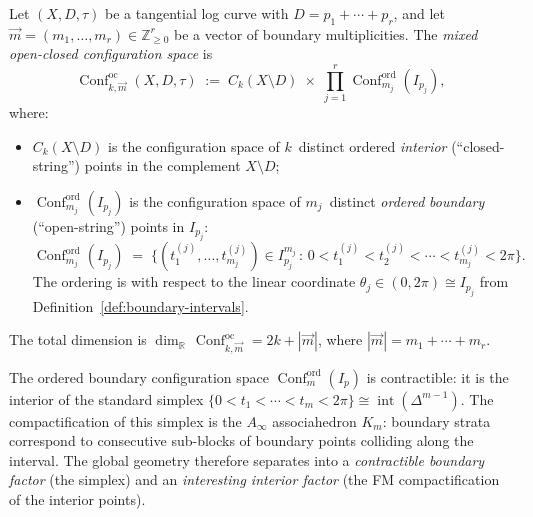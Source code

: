 \begin{definition}
\label{def:mixed-config-space}
Let $(X, D, \tau)$ be a tangential log curve with $D = p_1 +
\cdots + p_r$, and let $\vec{m} = (m_1, \ldots, m_r) \in
\mathbb{Z}_{\geq 0}^r$ be a vector of boundary multiplicities.
The \emph{mixed open-closed configuration space} is
\begin{equation}\label{eq:mixed-config-space}
\operatorname{Conf}^{\mathrm{oc}}_{k, \vec{m}}(X, D, \tau)
\;:=\;
C_k(X \setminus D)
\;\times\;
\prod_{j=1}^{r}
\operatorname{Conf}^{\mathrm{ord}}_{m_j}(I_{p_j}),
\end{equation}
where:
\begin{itemize}
\item $C_k(X \setminus D)$ is the configuration space of
  $k$~distinct ordered \emph{interior} (``closed-string'') points
  in the complement $X \setminus D$;
\item $\operatorname{Conf}^{\mathrm{ord}}_{m_j}(I_{p_j})$ is the
  configuration space of $m_j$~distinct \emph{ordered}
  \emph{boundary} (``open-string'') points in $I_{p_j}$:
  \begin{equation}\label{eq:ordered-boundary-config}
  \operatorname{Conf}^{\mathrm{ord}}_{m_j}(I_{p_j})
  \;=\;
  \bigl\{(t_1^{(j)}, \ldots, t_{m_j}^{(j)}) \in
  I_{p_j}^{m_j}
  \,:\,
  0 < t_1^{(j)} < t_2^{(j)} < \cdots < t_{m_j}^{(j)} < 2\pi
  \bigr\}.
  \end{equation}
  The ordering is with respect to the linear coordinate
  $\theta_j \in (0, 2\pi) \cong I_{p_j}$ from
  Definition~\ref{def:boundary-intervals}.
\end{itemize}
The total dimension is
$\dim_{\mathbb{R}}\,
\operatorname{Conf}^{\mathrm{oc}}_{k,\vec{m}}
= 2k + |\vec{m}|$,
where $|\vec{m}| = m_1 + \cdots + m_r$.
\end{definition}

\begin{remark}
\label{rem:boundary-ordering-associahedron}
The ordered boundary configuration space
$\operatorname{Conf}^{\mathrm{ord}}_{m}(I_p)$ is contractible:
it is the interior of the standard simplex
$\{0 < t_1 < \cdots < t_m < 2\pi\} \cong
\operatorname{int}(\Delta^{m-1})$.  The compactification of this
simplex is the $A_\infty$ associahedron $K_m$: boundary strata
correspond to consecutive sub-blocks of boundary points colliding
along the interval.  The global geometry therefore separates into a
\emph{contractible boundary factor} (the simplex) and an
\emph{interesting interior factor} (the FM compactification of the
interior points).
\end{remark}

